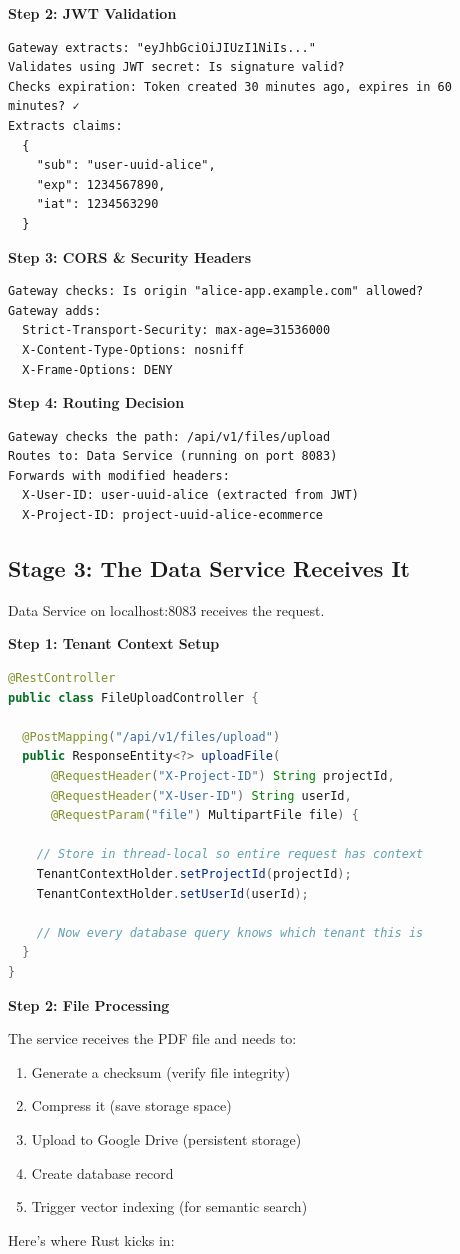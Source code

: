 \documentclass[11pt,a4paper]{report}
\begin{document}
\textbf{Step 2: JWT Validation}
\begin{lstlisting}[language=text]
Gateway extracts: "eyJhbGciOiJIUzI1NiIs..."
Validates using JWT secret: Is signature valid?
Checks expiration: Token created 30 minutes ago, expires in 60 minutes? ✓
Extracts claims: 
  {
    "sub": "user-uuid-alice",
    "exp": 1234567890,
    "iat": 1234563290
  }
\end{lstlisting}

\textbf{Step 3: CORS \& Security Headers}
\begin{lstlisting}[language=text]
Gateway checks: Is origin "alice-app.example.com" allowed?
Gateway adds: 
  Strict-Transport-Security: max-age=31536000
  X-Content-Type-Options: nosniff
  X-Frame-Options: DENY
\end{lstlisting}

\textbf{Step 4: Routing Decision}
\begin{lstlisting}[language=text]
Gateway checks the path: /api/v1/files/upload
Routes to: Data Service (running on port 8083)
Forwards with modified headers:
  X-User-ID: user-uuid-alice (extracted from JWT)
  X-Project-ID: project-uuid-alice-ecommerce
\end{lstlisting}


\subsection{Stage 3: The Data Service Receives It}


Data Service on localhost:8083 receives the request.

\textbf{Step 1: Tenant Context Setup}
\begin{lstlisting}[language=Java]
@RestController
public class FileUploadController {
  
  @PostMapping("/api/v1/files/upload")
  public ResponseEntity<?> uploadFile(
      @RequestHeader("X-Project-ID") String projectId,
      @RequestHeader("X-User-ID") String userId,
      @RequestParam("file") MultipartFile file) {
    
    // Store in thread-local so entire request has context
    TenantContextHolder.setProjectId(projectId);
    TenantContextHolder.setUserId(userId);
    
    // Now every database query knows which tenant this is
  }
}
\end{lstlisting}

\textbf{Step 2: File Processing}

The service receives the PDF file and needs to:
\begin{enumerate}
\item Generate a checksum (verify file integrity)
\item Compress it (save storage space)
\item Upload to Google Drive (persistent storage)
\item Create database record
\item Trigger vector indexing (for semantic search)

\end{enumerate}
Here's where Rust kicks in:
\end{document}
